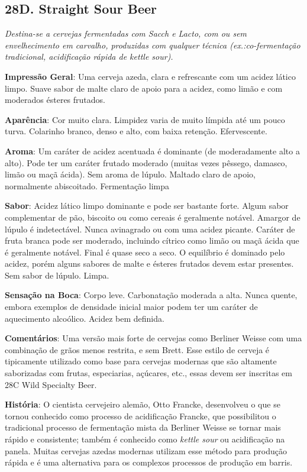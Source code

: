 \subsection*{28D. Straight Sour Beer}
\textit{Destina-se a cervejas fermentadas com Sacch e Lacto, com ou sem envelhecimento em carvalho, produzidas com qualquer técnica (ex.:co-fermentação tradicional, acidificação rápida de kettle sour).}

\textbf{Impressão Geral}: Uma cerveja azeda, clara e refrescante com um acidez lático limpo. Suave sabor de malte claro de apoio para a acidez, como limão e com moderados ésteres frutados.

\textbf{Aparência}: Cor muito clara. Limpidez varia de muito límpida até um pouco turva. Colarinho branco, denso e alto, com baixa retenção. Efervescente.

\textbf{Aroma}: Um caráter de acidez acentuada é dominante (de moderadamente alto a alto). Pode ter um caráter frutado moderado (muitas vezes pêssego, damasco, limão ou maçã ácida). Sem aroma de lúpulo. Maltado claro de apoio, normalmente abiscoitado. Fermentação limpa

\textbf{Sabor}: Acidez lático limpo dominante e pode ser bastante forte. Algum sabor complementar de pão, biscoito ou como cereais é geralmente notável. Amargor de lúpulo é indetectável. Nunca avinagrado ou com uma acidez picante. Caráter de fruta branca pode ser moderado, incluindo cítrico como limão ou maçã ácida que é geralmente notável. Final é quase seco a seco. O equilíbrio é dominado pelo acidez, porém alguns sabores de malte e ésteres frutados devem estar presentes. Sem sabor de lúpulo. Limpa.

\textbf{Sensação na Boca}: Corpo leve. Carbonatação moderada a alta. Nunca quente, embora exemplos de densidade inicial maior podem ter um caráter de aquecimento alcoólico. Acidez bem definida.

\textbf{Comentários}: Uma versão mais forte de cervejas como Berliner Weisse com uma combinação de grãos menos restrita, e sem Brett. Esse estilo de cerveja é tipicamente utilizado como base para cervejas modernas que são altamente saborizadas com frutas, especiarias, açúcares, etc., essas devem ser inscritas em 28C Wild Specialty Beer.

\textbf{História}: O cientista cervejeiro alemão, Otto Francke, desenvolveu o que se tornou conhecido como processo de acidificação Francke, que possibilitou o tradicional processo de fermentação mista da Berliner Weisse se tornar mais rápido e consistente; também é conhecido como \textit{kettle sour} ou acidificação na panela. Muitas cervejas azedas modernas utilizam esse método para produção rápida e é uma alternativa para os complexos processos de produção em barris.


